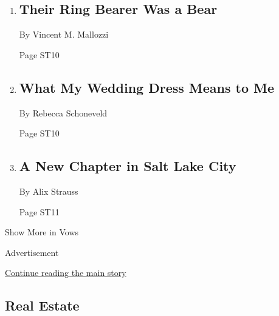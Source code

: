 \begin{enumerate}
\def\labelenumi{\arabic{enumi}.}
\item
  \href{/2020/04/17/style/coronavirus-a-Bear-for-a-ringbearer-Vows.html}{}

  \hypertarget{their-ring-bearer-was-a-bear}{%
  \subsection{Their Ring Bearer Was a
  Bear}\label{their-ring-bearer-was-a-bear}}

  By Vincent M. Mallozzi

  Page ST10
\item
  \href{/2020/04/16/fashion/weddings/what-my-wedding-dress-means-to-me.html}{}

  \hypertarget{what-my-wedding-dress-means-to-me}{%
  \subsection{What My Wedding Dress Means to
  Me}\label{what-my-wedding-dress-means-to-me}}

  By Rebecca Schoneveld

  Page ST10
\item
  \href{/2020/04/18/fashion/a-new-chapter-in-salt-lake-city.html}{}

  \hypertarget{a-new-chapter-in-salt-lake-city}{%
  \subsection{A New Chapter in Salt Lake
  City}\label{a-new-chapter-in-salt-lake-city}}

  By Alix Strauss

  Page ST11
\end{enumerate}

Show More in Vows

Advertisement

\protect\hyperlink{after-mid8}{Continue reading the main story}

\hypertarget{real-estate}{%
\subsection{Real Estate}\label{real-estate}}

